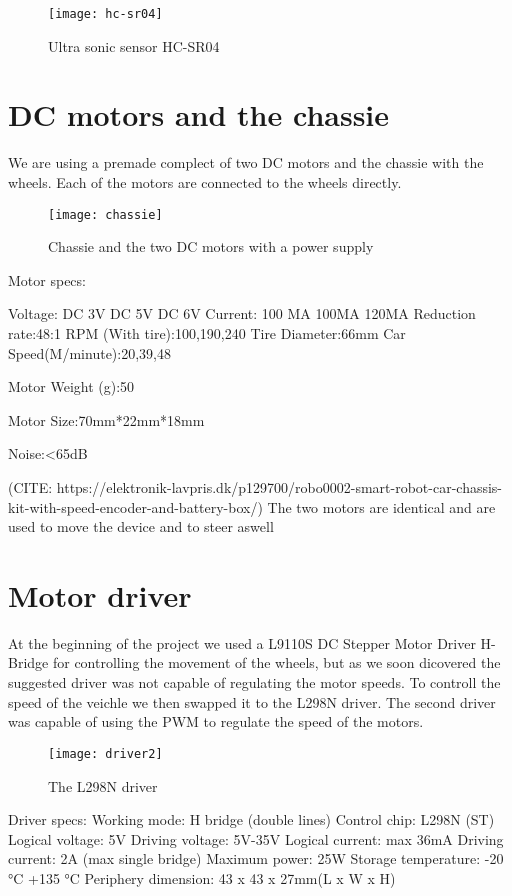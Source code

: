 \begin{figure}[h]
\centering
\texttt{[image: hc-sr04]}
\caption{Ultra sonic sensor HC-SR04}
\label{fig::hcsr04}
\end{figure}

\section{DC motors and the chassie} 

We are using a premade complect of two DC motors and the chassie with the wheels.
Each of the motors are connected to the wheels directly.

\begin{figure}[h]
\centering
\texttt{[image: chassie]}
\caption{Chassie and the two DC motors with a power supply}
\label{fig::chassie}
\end{figure}

Motor specs:

 Voltage:
DC 3V
DC 5V
DC 6V
Current:
100 MA
100MA
120MA
Reduction rate:48:1
RPM (With tire):100,190,240
Tire Diameter:66mm
Car Speed(M/minute):20,39,48

Motor Weight (g):50

Motor Size:70mm*22mm*18mm

Noise:<65dB 

(CITE: https://elektronik-lavpris.dk/p129700/robo0002-smart-robot-car-chassis-kit-with-speed-encoder-and-battery-box/)
The two motors are identical and are used to move the device and to steer aswell

\section{Motor driver} 

At the beginning of the project we used a L9110S DC Stepper Motor Driver H-Bridge for controlling the movement of the wheels, but as we soon dicovered the suggested driver was not capable of regulating the motor speeds.
To controll the speed of the veichle we then swapped it to the L298N driver.
The second driver was capable of using the PWM to regulate the speed of the motors.

\begin{figure}[h]
\centering
\texttt{[image: driver2]}
\caption{The L298N driver}
\label{fig::driver2}
\end{figure}

Driver specs:
Working mode:	H bridge (double lines)
Control chip:	L298N (ST)
Logical voltage:	5V
Driving voltage:	5V-35V
Logical current:	max 36mA
Driving current:	2A (max single bridge)
Maximum power:	25W
Storage temperature:	-20 °C +135 °C
Periphery dimension:	43 x 43 x 27mm(L x W x H)

